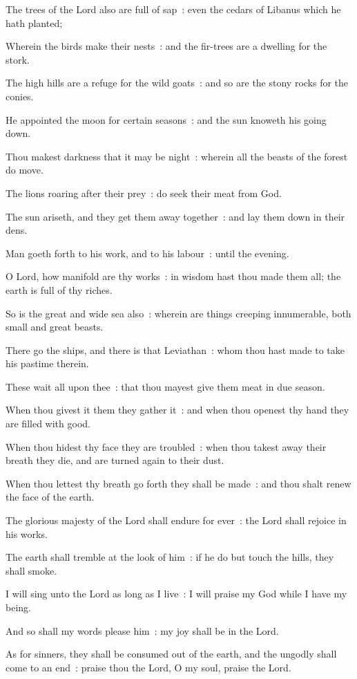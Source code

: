 The trees of the Lord also are full of sap~: even the cedars of Libanus which he hath planted;\par
{}Wherein the birds make their nests~: and the fir-trees are a dwelling for the stork.\par
{}The high hills are a refuge for the wild goats~: and so are the stony rocks for the conies.\par
{}He appointed the moon for certain seasons~: and the sun knoweth his going down.\par
{}Thou makest darkness that it may be night~: wherein all the beasts of the forest do move.\par
{}The lions roaring after their prey~: do seek their meat from God.\par
{}The sun ariseth, and they get them away together~: and lay them down in their dens.\par
{}Man goeth forth to his work, and to his labour~: until the evening.\par
{}O Lord, how manifold are thy works~: in wisdom hast thou made them all; the earth is full of thy riches.\par
{}So is the great and wide sea also~: wherein are things creeping innumerable, both small and great beasts.\par
{}There go the ships, and there is that Leviathan~: whom thou hast made to take his pastime therein.\par
{}These wait all upon thee~: that thou mayest give them meat in due season.\par
{}When thou givest it them they gather it~: and when thou openest thy hand they are filled with good.\par
{}When thou hidest thy face they are troubled~: when thou takest away their breath they die, and are turned again to their dust.\par
{}When thou lettest thy breath go forth they shall be made~: and thou shalt renew the face of the earth.\par
{}The glorious majesty of the Lord shall endure for ever~: the Lord shall rejoice in his works.\par
{}The earth shall tremble at the look of him~: if he do but touch the hills, they shall smoke.\par
{}I will sing unto the Lord as long as I live~: I will praise my God while I have my being.\par
{}And so shall my words please him~: my joy shall be in the Lord.\par
{}As for sinners, they shall be consumed out of the earth, and the ungodly shall come to an end~: praise thou the Lord, O my soul, praise the Lord.\par

